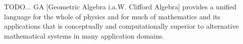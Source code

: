 TODO...
GA [Geometric Algebra i.a.W. Clifford Algebra] provides a unified language for the whole of physics and for much of mathematics and its applications that is conceptually and computationally superior to alternative mathematical systems in many application domains.